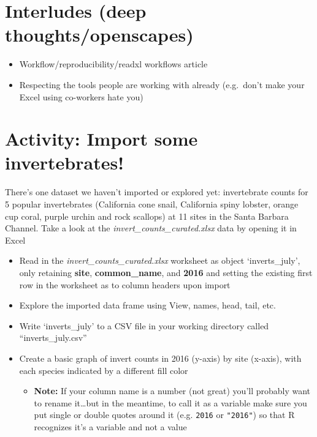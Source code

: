 \documentclass[]{book}
\providecommand{\tightlist}{%
  \setlength{\itemsep}{0pt}\setlength{\parskip}{0pt}}
\begin{document}
\hypertarget{interludes-deep-thoughtsopenscapes-3}{%
\section{Interludes (deep thoughts/openscapes)}\label{interludes-deep-thoughtsopenscapes-3}}

\begin{itemize}
\tightlist
\item
  Workflow/reproducibility/readxl workflows article
\item
  Respecting the tools people are working with already (e.g.~don't make your Excel using co-workers hate you)
\end{itemize}

\hypertarget{activity-import-some-invertebrates}{%
\section{Activity: Import some invertebrates!}\label{activity-import-some-invertebrates}}

There's one dataset we haven't imported or explored yet: invertebrate counts for 5 popular invertebrates (California cone snail, California spiny lobster, orange cup coral, purple urchin and rock scallops) at 11 sites in the Santa Barbara Channel. Take a look at the \emph{invert\_counts\_curated.xlsx} data by opening it in Excel

\begin{itemize}
\tightlist
\item
  Read in the \emph{invert\_counts\_curated.xlsx} worksheet as object `inverts\_july', only retaining \textbf{site}, \textbf{common\_name}, and \textbf{2016} and setting the existing first row in the worksheet as to column headers upon import
\item
  Explore the imported data frame using View, names, head, tail, etc.
\item
  Write `inverts\_july' to a CSV file in your working directory called ``inverts\_july.csv''
\item
  Create a basic graph of invert counts in 2016 (y-axis) by site (x-axis), with each species indicated by a different fill color

  \begin{itemize}
  \tightlist
  \item
    \textbf{Note:} If your column name is a number (not great) you'll probably want to rename it\ldots{}but in the meantime, to call it as a variable make sure you put single or double quotes around it (e.g. \texttt{\textquotesingle{}2016\textquotesingle{}} or \texttt{"2016"}) so that R recognizes it's a variable and not a value
  \end{itemize}
\end{itemize}
\end{document}
